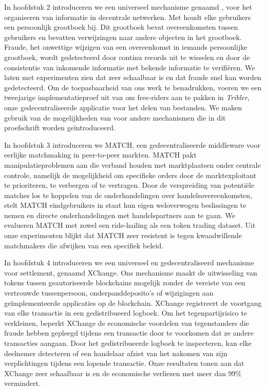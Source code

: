 {In hoofdstuk 2 introduceren we een universeel mechanisme genaamd \emph{\TrustChain{}}, voor het organiseren van informatie in decentrale netwerken.
Met \emph{\TrustChain{}} houdt elke gebruikers een persoonlijk grootboek bij.
Dit grootboek bevat overeenkomsten tussen gebruikers en bevatten verwijzingen naar andere objecten in het grootboek.
Fraude, het onwettige wijzigen van een overeenkomst in iemands persoonlijke grootboek, wordt gedetecteerd door continu records uit te wisselen en door de consistentie van inkomende informatie met bekende informatie te verifiëren.
We laten met experimenten zien dat \emph{\TrustChain{}} zeer schaalbaar is en dat fraude snel kan worden gedetecteerd.
Om de toepasbaarheid van ons werk te benadrukken, voeren we een tweejarige implementatieproef uit van \emph{\TrustChain{}} om free-riders aan te pakken in \emph{Tribler}, onze gedecentraliseerde applicatie voor het delen van bestanden.
We maken gebruik van de mogelijkheden van \emph{\TrustChain{}} voor andere mechanismen die in dit proefschrift worden geïntroduceerd.

In hoofdstuk 3 introduceren we MATCH, een gedecentraliseerde middleware voor eerlijke matchmaking in peer-to-peer markten.
MATCH pakt manipulatieproblemen aan die verband houden met marktplaatsen onder centrale controle, namelijk de mogelijkheid om specifieke orders door de marktexploitant te prioriteren, te verbergen of te vertragen.
Door de verspreiding van potentiële matches los te koppelen van de onderhandelingen over handelsovereenkomsten, stelt MATCH eindgebruikers in staat hun eigen weloverwogen beslissingen te nemen en directe onderhandelingen met handelspartners aan te gaan.
We evalueren MATCH met zowel een ride-hailing als een token trading dataset.
Uit onze experimenten blijkt dat MATCH zeer resistent is tegen kwaadwillende matchmakers die afwijken van een specifiek beleid.

In hoofdstuk 4 introduceren we een universeel en gedecentraliseerd mechanisme voor settlement, genaamd XChange.
Ons mechanisme maakt de uitwisseling van tokens tussen geautoriseerde blockchains mogelijk zonder de vereiste van een vertrouwde tussenpersoon, onderpanddeposito's of wijzigingen aan geïmplementeerde applicaties op de blockchain.
XChange registreert de voortgang van elke transactie in een gedistribueerd logboek.
Om het tegenpartijrisico te verkleinen, beperkt XChange de economische voordelen van tegenstanders die fraude hebben gepleegd tijdens een transactie door te voorkomen dat ze andere transacties aangaan.
Door het gedistribueerde logboek te inspecteren, kan elke deelnemer detecteren of een handelaar afziet van het nakomen van zijn verplichtingen tijdens een lopende transactie.
Onze resultaten tonen aan dat XChange zeer schaalbaar is en de economische verliezen met meer dan 99\% vermindert.

}
